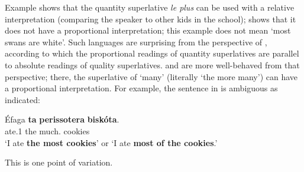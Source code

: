 \documentclass[output=paper
,modfonts
,nonflat]{langsci/langscibook}
\begin{document}
Example  shows that the quantity superlative \textit{le plus} can be used with a relative interpretation (comparing the speaker to other kids in the school);  shows that it does not have a proportional interpretation; this example does not mean `most swans are white'. Such languages are surprising from the perspective of \citet{Hackl2000,Hackl2009}, according to which the proportional readings of quantity superlatives are parallel to absolute readings of quality superlatives.  and  are more well-behaved from that perspective; there, the superlative of `many' (literally `the more many') can have a proportional interpretation. For example, the  sentence in  is ambiguous as indicated:

\ea \label{ex:coppockstrand:5}
\gll Éfaga \textbf{ta} \textbf{perissotera} \textbf{biskóta}.\\
ate.1\sg{} the much.\cmpr{} cookies\\ 
\glt `I ate \textbf{the most cookies}' or `I ate \textbf{most of the cookies}.'
\z

This is one point of variation.
\end{document}
